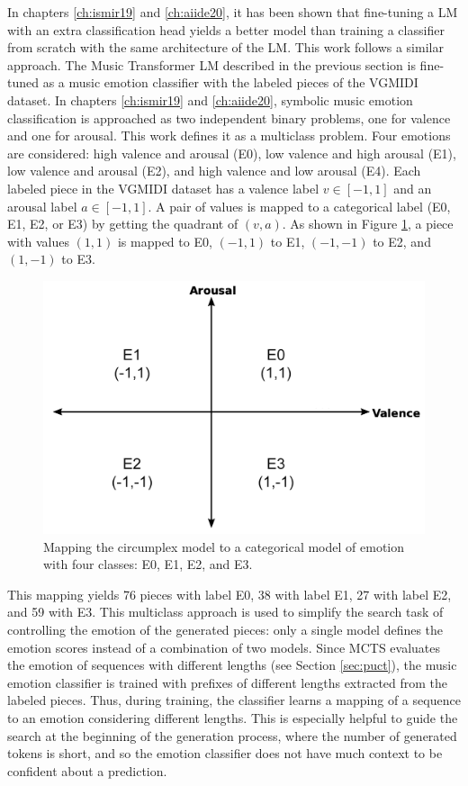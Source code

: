 In chapters \ref{ch:ismir19} and \ref{ch:aiide20}, it has been shown that fine-tuning a LM with an extra classification head yields a better model than training a classifier from scratch with the same architecture of the LM. This work follows a similar approach. The Music Transformer LM described in the previous section is fine-tuned as a music emotion classifier with the labeled pieces of the VGMIDI dataset. In chapters \ref{ch:ismir19} and \ref{ch:aiide20}, symbolic music emotion classification is approached as two independent binary problems, one for valence and one for arousal. This work defines it as a multiclass problem. Four emotions are considered: high valence and arousal (E0), low valence and high arousal (E1), low valence and arousal (E2), and high valence and low arousal (E4). Each labeled piece in the VGMIDI dataset has a valence label $v \in [-1, 1]$ and an arousal label $a \in [-1, 1]$. A pair of values is mapped to a categorical label (E0, E1, E2, or E3) by getting the quadrant of $(v,a)$. As shown in Figure \ref{fig:va_mapping}, a piece with values $(1,1)$ is mapped to E0, $(-1,1)$ to E1, $(-1,-1)$ to E2, and $(1, -1)$ to E3.

\begin{figure}
 \centering
 \includegraphics[width=0.7\columnwidth]{imgs/ismir21/circumplex.png}
 \caption{Mapping the circumplex model to a categorical model of emotion with four classes: E0, E1, E2, and E3.}
 \label{fig:va_mapping}
\end{figure}

This mapping yields 76 pieces with label E0, 38 with label E1, 27 with label E2, and 59 with E3. This multiclass approach is used to simplify the search task of controlling the emotion of the generated pieces: only a single model defines the emotion scores instead of a combination of two models. Since MCTS evaluates the emotion of sequences with different lengths (see Section \ref{sec:puct}), the music emotion classifier is trained with prefixes of different lengths extracted from the labeled pieces. Thus, during training, the classifier learns a mapping of a sequence to an emotion considering different lengths. This is especially helpful to guide the search at the beginning of the generation process, where the number of generated tokens is short, and so the emotion classifier does not have much context to be confident about a prediction.


